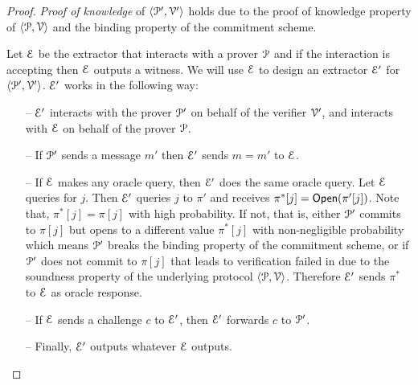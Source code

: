 \begin{proof}
	\textit{Proof of knowledge} of $\langle \mathcal{P}', \mathcal{V}' \rangle$ holds due to the proof of knowledge property of $\langle \mathcal{P}, \mathcal{V} \rangle$ and the binding property of the commitment scheme. 
	
	Let $\mathcal{E}$ be the extractor that interacts with a prover $\mathcal{P}$ and if the interaction is accepting then $\mathcal{E}$ outputs a witness. We will use $\mathcal{E}$ to design an extractor $\mathcal{E}'$ for $\langle \mathcal{P}', \mathcal{V}' \rangle$. $\mathcal{E}'$ works in the following way:
	\begin{itemize}
		\item[--] $\mathcal{E}'$ interacts with the prover $\mathcal{P}'$ on behalf of the verifier $\mathcal{V}'$, and interacts with $\mathcal{E}$ on behalf of the prover $\mathcal{P}$.
		\item[--] If $\mathcal{P}'$ sends a message $m'$ then $\mathcal{E}'$ sends $m=m'$ to $\mathcal{E}$. 
		\item[--] If $\mathcal{E}$ makes any oracle query, then $\mathcal{E}'$ does the same oracle query. Let $\mathcal{E}$ queries for $j$. Then $\mathcal{E}'$ queries $j$ to $\pi'$ and receives $\pi^\ast[j] = \mathsf{Open}(\pi'[j])$. 
		Note that, $\pi^\ast[j] = \pi[j]$ with high probability. If not, that is, either $\mathcal{P}'$ commits to $\pi[j]$ but opens to a different value $\pi^\ast[j]$ with non-negligible probability which means $\mathcal{P}'$ breaks the binding property of the commitment scheme, or if $\mathcal{P}'$ does not commit to $\pi[j]$ that leads to verification failed in due to the soundness property of the underlying protocol $\langle \mathcal{P}, \mathcal{V} \rangle$.
		Therefore $\mathcal{E}'$ sends $\pi^\ast$ to $\mathcal{E}$ as oracle response.
		\item[--] If $\mathcal{E}$ sends a challenge $c$ to $\mathcal{E}'$, then $\mathcal{E}'$ forwards $c$ to $\mathcal{P}'$.
		\item[--] Finally, $\mathcal{E}'$ outputs whatever $\mathcal{E}$ outputs. 
	\end{itemize}
%	
	

\end{proof}
